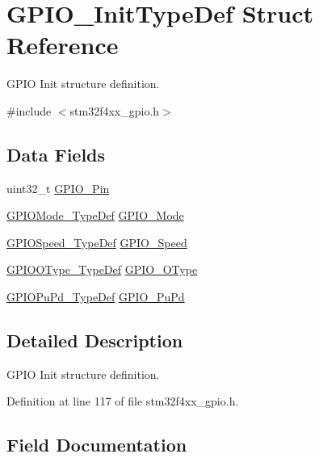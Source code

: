 \hypertarget{struct_g_p_i_o___init_type_def}{}\section{G\+P\+I\+O\+\_\+\+Init\+Type\+Def Struct Reference}
\label{struct_g_p_i_o___init_type_def}


G\+P\+IO Init structure definition.  




{\ttfamily \#include $<$stm32f4xx\+\_\+gpio.\+h$>$}

\subsection*{Data Fields}
\begin{DoxyCompactItemize}
\item 
uint32\+\_\+t \hyperlink{struct_g_p_i_o___init_type_def_a15699fc7e215ac2579cd24ca76cd4591}{G\+P\+I\+O\+\_\+\+Pin}
\item 
\hyperlink{group___g_p_i_o_ga1347339e1c84a196fabbb31205eec5d4}{G\+P\+I\+O\+Mode\+\_\+\+Type\+Def} \hyperlink{struct_g_p_i_o___init_type_def_a0c7e8901d8b511bbb8c3b153f705dbba}{G\+P\+I\+O\+\_\+\+Mode}
\item 
\hyperlink{group___g_p_i_o_ga062ad92b67b4a1f301c161022cf3ba8e}{G\+P\+I\+O\+Speed\+\_\+\+Type\+Def} \hyperlink{struct_g_p_i_o___init_type_def_a57b08335216f50618ebc080e4fbb0a80}{G\+P\+I\+O\+\_\+\+Speed}
\item 
\hyperlink{group___g_p_i_o_gae74212e8d66c389f47326b06bdf6d2ab}{G\+P\+I\+O\+O\+Type\+\_\+\+Type\+Def} \hyperlink{struct_g_p_i_o___init_type_def_a321a268abbed3d2f01c27383e8daf92d}{G\+P\+I\+O\+\_\+\+O\+Type}
\item 
\hyperlink{group___g_p_i_o_gafb7ecd99c44b4fd702d669304a36c2c8}{G\+P\+I\+O\+Pu\+Pd\+\_\+\+Type\+Def} \hyperlink{struct_g_p_i_o___init_type_def_aeb0168ffc465346d21f3120aec320b72}{G\+P\+I\+O\+\_\+\+Pu\+Pd}
\end{DoxyCompactItemize}


\subsection{Detailed Description}
G\+P\+IO Init structure definition. 

Definition at line 117 of file stm32f4xx\+\_\+gpio.\+h.



\subsection{Field Documentation}
\mbox{\label{struct_g_p_i_o___init_type_def_a0c7e8901d8b511bbb8c3b153f705dbba}} 
